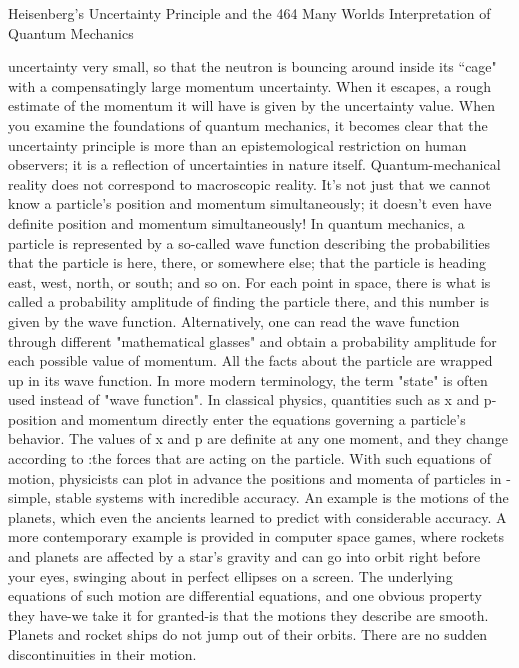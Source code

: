 Heisenberg's Uncertainty Principle and the                                            464
Many Worlds Interpretation of Quantum Mechanics

uncertainty very small, so that the neutron is bouncing around inside its ``cage" with a
compensatingly large momentum uncertainty. When it escapes, a rough estimate of
the momentum it will have is given by the uncertainty value.
        When you examine the foundations of quantum mechanics, it becomes clear
that the uncertainty principle is more than an epistemological restriction on human
observers; it is a reflection of uncertainties in nature itself. Quantum-mechanical
reality does not correspond to macroscopic reality. It's not just that we cannot know a
particle's position and momentum simultaneously; it doesn't even have definite
position and momentum simultaneously!
        In quantum mechanics, a particle is represented by a so-called wave function
describing the probabilities that the particle is here, there, or somewhere else; that the
particle is heading east, west, north, or south; and so on. For each point in space, there
is what is called a probability amplitude of finding the particle there, and this number
is given by the wave function. Alternatively, one can read the wave function through
different "mathematical glasses" and obtain a probability amplitude for each possible
value of momentum. All the facts about the particle are wrapped up in its wave
function. In more modern terminology, the term "state" is often used instead of "wave
function".
        In classical physics, quantities such as x and p-position and momentum
directly enter the equations governing a particle's behavior. The values of x and p are
definite at any one moment, and they change according to :the forces that are acting
on the particle. With such equations of motion, physicists can plot in advance the
positions and momenta of particles in -simple, stable systems with incredible
accuracy. An example is the motions of the planets, which even the ancients learned
to predict with considerable accuracy. A more contemporary example is provided in
computer space games, where rockets and planets are affected by a star's gravity and
can go into orbit right before your eyes, swinging about in perfect ellipses on a screen.
The underlying equations of such motion are differential equations, and one obvious
property they have-we take it for granted-is that the motions they describe are smooth.
Planets and rocket ships do not jump out of their orbits. There are no sudden
discontinuities in their motion.
